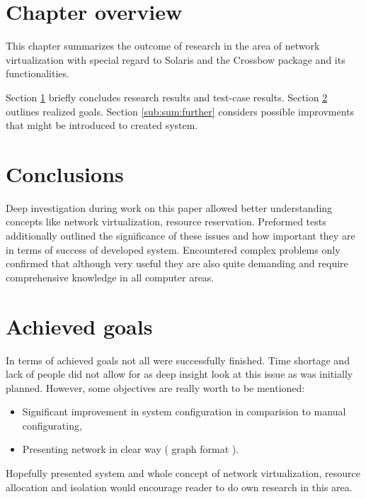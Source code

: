 \documentclass[11pt]{book}
\begin{document}
    \section*{Chapter overview}

	  This chapter summarizes the outcome of research in the area of network virtualization with special regard to 
	  Solaris and the Crossbow package and its functionalities. 
	  
	  Section \ref{sub:sum:concl} briefly concludes research results and test-case results.
	  Section \ref{sub:sum:achieved} outlines realized goals.
	  Section \ref{sub:sum:further} considers possible improvments that might be introduced to created system.

    \section{Conclusions}
		\label{sub:sum:concl}
		
		Deep investigation during work on this paper allowed better understanding concepts like network virtualization,
		resource reservation. Preformed tests additionally outlined the significance of these issues and how important they
		are in terms of success of developed system. Encountered complex problems only confirmed that although very useful 
		they are also quite demanding and require comprehensive knowledge in all computer areas.
		
    \section{Achieved goals}
		\label{sub:sum:achieved}
		
		In terms of achieved goals not all were successfully finished. Time shortage and lack of people did not allow 
		for as deep insight look at this issue as was initially planned. However, some objectives are really worth to
		be mentioned:
	  
		\begin{itemize}
			\item{Significant improvement in system configuration in comparision to manual configurating,}
			\item{Presenting network in clear way ( graph format ).}
		\end{itemize}
		
	    Hopefully presented system and whole concept of network virtualization, resource allocation and isolation 
	    would encourage reader to do own research in this area.
		
\end{document}

